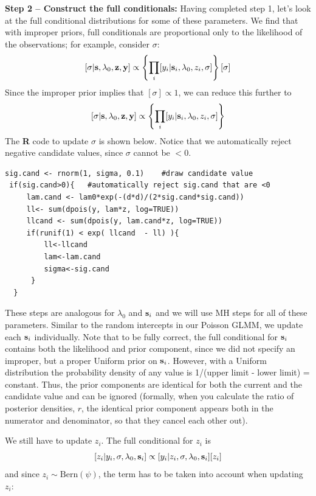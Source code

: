 {\bf Step 2 -- Construct the full conditionals:}
Having completed step 1, let's look at the full conditional distributions for some of these parameters.
We find that with improper priors, full conditionals are proportional only to the likelihood of the observations; for example, consider $\sigma$:
\[
[\sigma|{\bf s}, \lambda_{0}, {\bf z}, {\bf y}] \propto \left\{ \prod_{i} [y_{i}| {\bf
    s}_{i}, \lambda_{0}, z_{i}, \sigma] \right\}  [\sigma]
\]
Since the improper prior implies that $[\sigma] \propto 1$, we can reduce this further to
\[
[\sigma|{\bf s}, \lambda_{0}, {\bf z}, {\bf y}] \propto \left\{
  \prod_{i} [y_{i}| {\bf s}_{i}, \lambda_{0}, z_{i}, \sigma] \right\}
\]
The {\bf R} code to update $\sigma$ is shown below.
Notice that we automatically reject negative candidate values, since $\sigma$ cannot be $<0$.

\begin{verbatim}
sig.cand <- rnorm(1, sigma, 0.1)	#draw candidate value
 if(sig.cand>0){   #automatically reject sig.cand that are <0
     lam.cand <- lam0*exp(-(d*d)/(2*sig.cand*sig.cand))
     ll<- sum(dpois(y, lam*z, log=TRUE))
     llcand <- sum(dpois(y, lam.cand*z, log=TRUE))
     if(runif(1) < exp( llcand  - ll) ){
         ll<-llcand
         lam<-lam.cand
         sigma<-sig.cand
      }
  }
\end{verbatim}

These steps are analogous for  $\lambda_{0}$ and ${\bf s}_i$ and we will
use MH steps for
all of these parameters. Similar to the random intercepts in our
Poisson GLMM, we update each ${\bf s}_i$ individually. Note that to be fully
correct, the full conditional for ${\bf s}_i$ contains both the likelihood and
prior component, since we did not specify an improper, but a proper Uniform
prior on ${\bf s}_i$. However, with a Uniform distribution the probability
density of any value is 1/(upper limit - lower limit) =
constant. Thus, the prior components are identical for both the
current and the candidate value and can be ignored (formally, when you
calculate the ratio of posterior densities, $r$, the identical prior
component appears both in the numerator and denominator, so that they
cancel each other out).

We still have to update $z_i$. The full conditional for $z_i$ is
\[
[z_i|y_{i}, \sigma, \lambda_0, {\bf s}_{i}] \propto [y_{i}|z_{i},\sigma, \lambda_0,
{\bf s}_{i}] [z_i]
\]
and since $z_i \sim \mbox{Bern}(\psi)$,
the term has to be taken into account when updating $z_i$:

